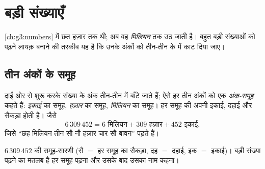 \chapter{बड़ी संख्याएँ}\label{ch:g4:numbers}

\cref{ch:g3:numbers} में छत हज़ार तक थी; अब वह \emph{मिलियन} तक
उठ जाती है। बहुत बड़ी संख्याओं को पढ़ने लायक़ बनाने की तरकीब यह
है कि उनके अंकों को तीन-तीन के  में काट दिया जाए।

\section{तीन अंकों के समूह}

\begin{definition}[अंक-समूह]\label{def:g4:numbers:classes}
दाईं ओर से शुरू करके संख्या के अंक तीन-तीन में बाँटे जाते हैं;
ऐसे हर तीन अंकों को एक \emph{अंक-समूह} कहते हैं: \emph{इकाई} का
समूह, \emph{हज़ार} का समूह, \emph{मिलियन} का समूह। हर समूह की
अपनी इकाई, दहाई और सैकड़ा होती है। जैसे
\[
6\,309\,452 = 6 \text{ मिलियन} + 309 \text{ हज़ार}
+ 452 \text{ इकाई},
\]
जिसे ``छह मिलियन तीन सौ नौ हज़ार चार सौ बावन''
पढ़ते हैं।
\end{definition}

\begin{omfigure}

{\small $6\,309\,452$ की समूह-सारणी (सै $=$ हर समूह का सैकड़ा,
दह $=$ दहाई, इक $=$ इकाई)। बड़ी संख्या पढ़ने का मतलब है हर समूह
पढ़ना और उसके बाद उसका नाम कहना।}
\end{omfigure}

